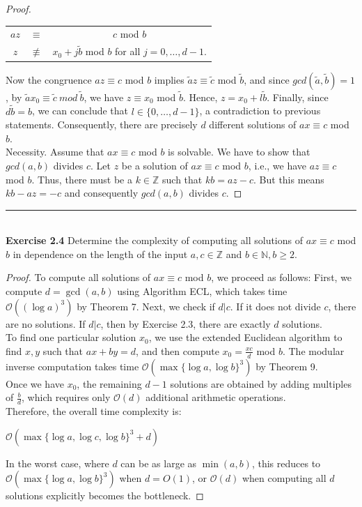 \documentclass[a4paper]{article}
\begin{document}
\begin{proof}
\begin{center}
\begin{tabular}{c c c}
$az$ & $\equiv$ & $c$ mod $b$ \\
$z$ & $\not \equiv$ & $x_{0} + j\tilde{b}$ mod $b$ for all $j = 0, \ldots, d-1$.
\end{tabular}
\end{center}
Now the congruence $az \equiv c$ mod $b$ implies $\tilde{a}z \equiv \tilde{c}$ mod $\tilde{b}$, and since $gcd(\tilde{a}, \tilde{b}) = 1$, by $\tilde{a}x_{0} \equiv \tilde{c}\ mod\ \tilde{b}$, we have $z \equiv x_{0}$ mod $\tilde{b}$. Hence, $z = x_{0} + l \tilde{b}$. Finally, since $d \tilde{b} = b$, we can conclude that $l \in \{0, \ldots, d - 1 \}$, a contradiction to previous statements. Consequently, there are precisely $d$ different solutions of $ax \equiv c$ mod $b$.\\
Necessity. Assume that $ax \equiv c$ mod $b$ is solvable. We have to show that $gcd(a, b)$ divides $c$. Let $z$ be a solution of $ax \equiv c$ mod $b$, i.e., we have $az \equiv c$ mod $b$. Thus, there must be a $k \in \mathbb{Z}$ such that $kb = az - c$. But this means $kb - az = -c$ and consequently $gcd(a,b)$ divides $c$.
\end{proof}



\noindent\rule{12cm}{0.4pt}\\
\noindent \textbf{Exercise 2.4} Determine the complexity of computing all solutions of $ax \equiv c$ mod $b$ in dependence on the length of the input $a, c \in \mathbb{Z}$ and $b \in \mathbb{N}, b \geq 2$.
\begin{proof}
To compute all solutions of $ax \equiv c$ mod $b$, we proceed as follows: First, we compute $d = \gcd(a, b)$ using Algorithm ECL, which takes time $\mathcal{O}((\log a)^3)$ by Theorem 7. Next, we check if $d | c$. If it does not divide $c$, there are no solutions. If $d | c$, then by Exercise 2.3, there are exactly $d$ solutions. \\
To find one particular solution $x_0$, we use the extended Euclidean algorithm to find $x, y$ such that $ax + by = d$, and then compute $x_0 = \frac{xc}{d}$ mod $b$. The modular inverse computation takes time $\mathcal{O}(\max\{\log a, \log b\}^3)$ by Theorem 9. \\
Once we have $x_0$, the remaining $d-1$ solutions are obtained by adding multiples of $\frac{b}{d}$, which requires only $\mathcal{O}(d)$ additional arithmetic operations.\\
Therefore, the overall time complexity is:
\begin{center}
$\mathcal{O}(\max\{\log a, \log c, \log b\}^3 + d)$
\end{center}
In the worst case, where $d$ can be as large as $\min(a, b)$, this reduces to $\mathcal{O}(\max\{\log a, \log b\}^3)$ when $d = O(1)$, or $\mathcal{O}(d)$ when computing all $d$ solutions explicitly becomes the bottleneck.
\end{proof}
\end{document}
